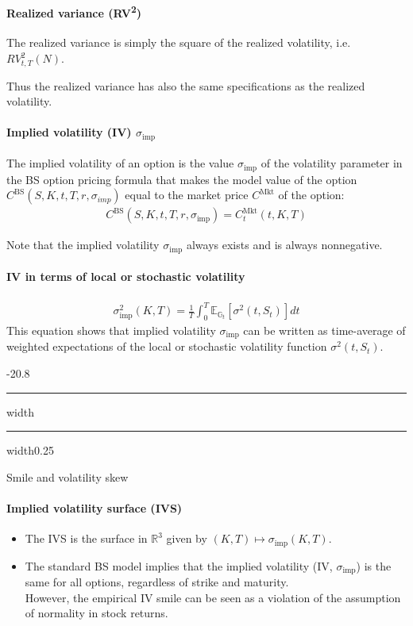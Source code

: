 \documentclass[a4paper,landscape,7pt,fleqn]{scrartcl}
\makeatletter
\renewcommand{\subsection}{\@startsection{subsection}{1}{0mm}%
{-2\baselineskip}{0.8\baselineskip}%
{\hrule depth 0.2pt width\columnwidth\hrule depth0.75pt
width0.25\columnwidth\vspace*{1.2em}\large\bfseries}}
\makeatother
\begin{document}
\begin{multicols*}{3}
\paragraph{Realized variance (RV\textsuperscript{2})}
The realized variance is simply the square of the realized volatility, i.e. $RV_{t,T}^2(N)$.

Thus the realized variance has also the same specifications as the realized volatility.

\paragraph{Implied volatility (IV) $\sigma_\text{imp}$}
The implied volatility of an option is the value $\sigma_\text{imp}$ of the volatility parameter in the BS option pricing formula that makes the model value of the option $C^\text{BS}(S,K,t,T,r,\sigma_{imp})$ equal to the market price $C^\text{Mkt}$ of the option:
\begin{align*}
C^\text{BS}(S,K,t,T,r,\sigma_\text{imp}) = C_t^\text{Mkt}(t,K,T)
\end{align*}

Note that the implied volatility $\sigma_\text{imp}$ always exists and is always nonnegative.

\paragraph{IV in terms of local or stochastic volatility}
\begin{align*}
\sigma_\text{imp}^2(K,T) = \frac{1}{T} \int_0^T \mathbb{E}_{\mathbb{G}_t} [\sigma^2(t,S_t)]dt
\end{align*}
This equation shows that implied volatility $\sigma_\text{imp}$ can be written as time-average of weighted expectations of the local or stochastic volatility function $\sigma^2(t,S_t)$.

\subsection{Smile and volatility skew}

\paragraph{Implied volatility surface (IVS)}
\begin{itemize}
\item The IVS is the surface in $\mathbb{R}^3$ given by $(K,T) \mapsto \sigma_\text{imp}(K,T)$.
\item The standard BS model implies that the implied volatility (IV, $\sigma_\text{imp}$) is the same for all options, regardless of strike and maturity. \\
However, the empirical IV smile can be seen as a violation of the assumption of normality in stock returns.
\end{itemize}


\end{multicols*}
\end{document}
